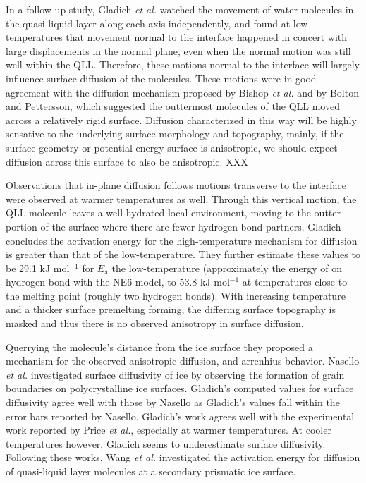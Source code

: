 In a follow up study, Gladich \textit{et al.} watched the movement of
water molecules in the quasi-liquid layer along each axis
independently, and found at low temperatures that movement normal to
the interface happened in concert with large displacements in the
normal plane, even when the normal motion was still well within the
QLL.\cite{Gladich2011} Therefore, these motions normal to
the interface will largely influence surface diffusion of the
molecules. These motions were in good agreement with the diffusion
mechanism proposed by Bishop \textit{et al.}\cite{Bishop2009} and by
Bolton and Pettersson\cite{Bolton2000}, which suggested the outtermost
molecules of the QLL moved across a relatively rigid
surface. Diffusion characterized in this way will be highly sensative
to the underlying surface morphology and topography, mainly, if the
surface geometry or potential energy surface is anisotropic, we should
expect diffusion across this surface to also be anisotropic. XXX

Observations that in-plane diffusion follows motions transverse to the
interface were observed at warmer temperatures as well. Through this
vertical motion, the QLL molecule leaves a well-hydrated local
environment, moving to the outter portion of the surface where there
are fewer hydrogen bond partners. Gladich concludes the activation
energy for the high-temperature mechanism for diffusion is greater
than that of the low-temperature. They further estimate these values
to be 29.1 kJ mol$^{-1}$ for $E_\mathrm{a}$ the low-temperature
(approximately the energy of on hydrogen bond with the NE6 model, to
53.8 kJ mol$^{-1}$ at temperatures close to the melting point (roughly
two hydrogen bonds).  With increasing temperature and a thicker
surface premelting forming, the differing surface topography is masked
and thus there is no observed anisotropy in surface diffusion.

Querrying the molecule's distance from the ice surface they proposed a
mechanism for the observed anisotropic diffusion, and arrenhius
behavior.\cite{Gladich2015} Nasello \textit{et al.} investigated
surface diffusivity of ice by observing the formation of grain
boundaries on polycrystalline ice surfaces.\cite{Nasello2007}
Gladich's computed values for surface diffusivity agree well with
those by Nasello as Gladich's values fall within the error bars
reported by Nasello. Gladich's work agrees well with the experimental
work reported by Price \textit{et al.}\cite{Price1999}, especially at
warmer temperatures. At cooler temperatures however, Gladich seems to
underestimate surface diffusivity.  Following these works, Wang
\textit{et al.} investigated the activation energy for diffusion of
quasi-liquid layer molecules at a secondary prismatic ice
surface.\cite{Wang2017}

